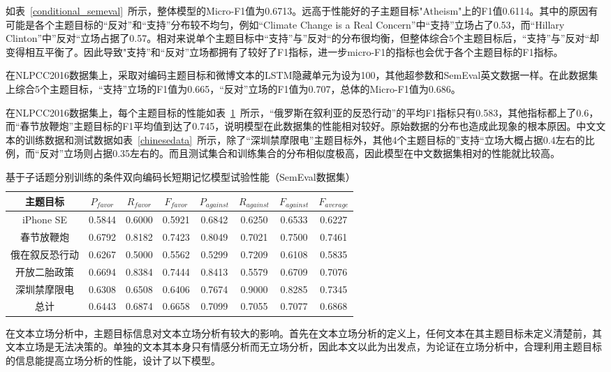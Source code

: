 如表~\ref{conditional_semeval}~所示，整体模型的Micro-F1值为0.6713。远高于性能好的子主题目标"Atheism"上的F1值0.6114。其中的原因有可能是各个主题目标的“反对”和“支持”分布较不均匀，例如“Climate Change is a Real Concern”中“支持”立场占了0.53，而“Hillary Clinton”中”反对“立场占据了0.57。相对来说单个主题目标中“支持”与”反对“的分布很均衡，但整体综合5个主题目标后，“支持”与”反对“却变得相互平衡了。因此导致"支持”和“反对”立场都拥有了较好了F1指标，进一步micro-F1的指标也会优于各个主题目标的F1指标。

在NLPCC2016数据集上，采取对编码主题目标和微博文本的LSTM隐藏单元为设为100，其他超参数和SemEval英文数据一样。在此数据集上综合5个主题目标，“支持”立场的F1值为0.665，“反对”立场的F1值为0.707，总体的Micro-F1值为0.686。

在NLPCC2016数据集上，每个主题目标的性能如表~\ref{chinese_condition}~所示，“俄罗斯在叙利亚的反恐行动”的平均F1指标只有0.583，其他指标都上了0.6，而“春节放鞭炮”主题目标的F1平均值到达了0.745，说明模型在此数据集的性能相对较好。原始数据的分布也造成此现象的根本原因。中文文本的训练数据和测试数据如表~\ref{chinesedata}~所示，除了“深圳禁摩限电”主题目标外，其他4个主题目标的”支持“立场大概占据0.4左右的比例，而“反对”立场则占据0.35左右的。而且测试集合和训练集合的分布相似度极高，因此模型在中文数据集相对的性能就比较高。
\begin{table}[htbp]
	\caption[table123]{基于子话题分别训练的条件双向编码长短期记忆模型试验性能（SemEval数据集）}
	\label{chinese_condition}
	\vspace{0.5em}\centering\wuhao
	\begin{tabular}{cccccccc}
		\toprule[1.5pt]
	主题目标& $P_{favor}$&$R_{favor}$&$F_{favor}$&$P_{against}$&$R_{against}$&$F_{against}$&$F_{average}$ \\
		\midrule[1pt]
		iPhone SE&0.5844&0.6000&0.5921&0.6842&0.6250&0.6533&0.6227\\
		春节放鞭炮&0.6792&0.8182&0.7423&0.8049&0.7021&0.7500&0.7461\\
		俄在叙反恐行动&0.6267&0.5000&0.5562&0.5299&0.7209&0.6108&0.5835\\
		开放二胎政策&0.6694&0.8384&0.7444&0.8413&0.5579&0.6709&0.7076\\
		深圳禁摩限电&0.6308&0.6508&0.6406&0.7674&0.9000&0.8285&0.7345\\
		总计&0.6443&0.6874&0.6658&0.7099&0.7055&0.7077&0.6868\\
		\bottomrule[1.5pt]
	\end{tabular}
\end{table}

在文本立场分析中，主题目标信息对文本立场分析有较大的影响。首先在文本立场分析的定义上，任何文本在其主题目标未定义清楚前，其文本立场是无法决策的。单独的文本其本身只有情感分析而无立场分析，因此本文以此为出发点，为论证在立场分析中，合理利用主题目标的信息能提高立场分析的性能，设计了以下模型。

